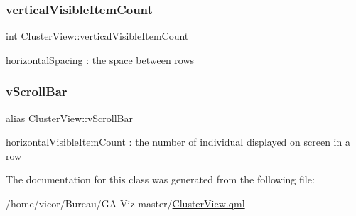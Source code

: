\subsubsection{\texorpdfstring{vertical\+Visible\+Item\+Count}{verticalVisibleItemCount}}
{\footnotesize\ttfamily int Cluster\+View\+::vertical\+Visible\+Item\+Count}

horizontal\+Spacing \+: the space between rows \mbox{\label{class_cluster_view_aef0c0c03c1b1db966584d58474c21043}} 
\subsubsection{\texorpdfstring{v\+Scroll\+Bar}{vScrollBar}}
{\footnotesize\ttfamily alias Cluster\+View\+::v\+Scroll\+Bar}

horizontal\+Visible\+Item\+Count \+: the number of individual displayed on screen in a row 

The documentation for this class was generated from the following file\+:\begin{DoxyCompactItemize}
\item 
/home/vicor/\+Bureau/\+G\+A-\/\+Viz-\/master/\hyperlink{_cluster_view_8qml}{Cluster\+View.\+qml}\end{DoxyCompactItemize}
